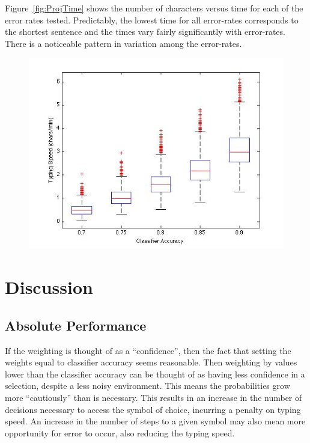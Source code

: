 \documentclass[12pt,titlepage]{article}
\begin{document}
Figure~\ref{fig:ProjTime} shows the number of characters versus time for each of the error rates tested. 
Predictably, the lowest time for all error-rates corresponds to the shortest sentence and the 
times vary fairly significantly with error-rates.  There is a noticeable pattern in variation among 
the error-rates.

\begin{figure}[t]
\begin{center}
	\includegraphics[scale=0.40]{ProjTypeSpeedComp.jpg}
	\label{fig:TypeSpeed}
\end{center}
\end{figure}

\section{Discussion}

\subsection{Absolute Performance}

If the weighting is thought of as a ``confidence'', then the fact that setting the weights equal to 
classifier accuracy seems reasonable.  Then weighting by values lower than the classifier 
accuracy can be thought of as having less confidence in a selection, despite a less noisy 
environment.  This means the probabilities grow more ``cautiously'' than is necessary.  This 
results in an increase in the number of decisions necessary to access the symbol of choice, 
incurring a penalty on typing speed.  An increase in the number of steps to a given symbol may 
also mean more opportunity for error to occur, also reducing the typing speed.
\end{document}
